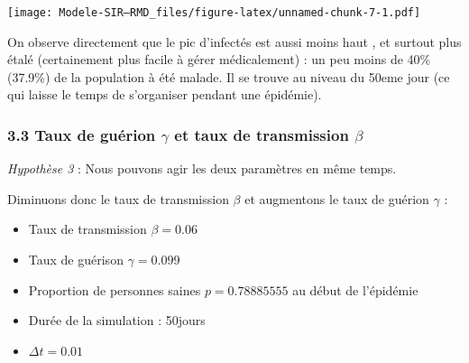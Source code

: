 \documentclass[
]{article}
\providecommand{\tightlist}{%
  \setlength{\itemsep}{0pt}\setlength{\parskip}{0pt}}
\begin{document}
\texttt{[image: Modele-SIR---RMD\_files/figure-latex/unnamed-chunk-7-1.pdf]}

On observe directement que le pic d'infectés est aussi moins haut , et
surtout plus étalé (certainement plus facile à gérer médicalement) : un
peu moins de 40\% (37.9\%) de la population à été malade. Il se trouve
au niveau du 50eme jour (ce qui laisse le temps de s'organiser pendant
une épidémie).

\hypertarget{taux-de-guuxe9rion-gamma-et-taux-de-transmission-beta}{%
\subsubsection{\texorpdfstring{3.3 Taux de guérion \(\gamma\) et taux de
transmission
\(\beta\)}{3.3 Taux de guérion \textbackslash gamma et taux de transmission \textbackslash beta}}\label{taux-de-guuxe9rion-gamma-et-taux-de-transmission-beta}}

\emph{Hypothèse 3} : Nous pouvons agir les deux paramètres en même
temps.

Diminuons donc le taux de transmission \(\beta\) et augmentons le taux
de guérion \(\gamma\) :

\begin{itemize}
\tightlist
\item
  Taux de transmission \(\beta = 0.06\)
\item
  Taux de guérison \(\gamma=0.099\)
\item
  Proportion de personnes saines \(p=0.78885555\) au début de l'épidémie
\item
  Durée de la simulation : 50jours
\item
  \(\Delta t= 0.01\)
\end{itemize}
\end{document}

